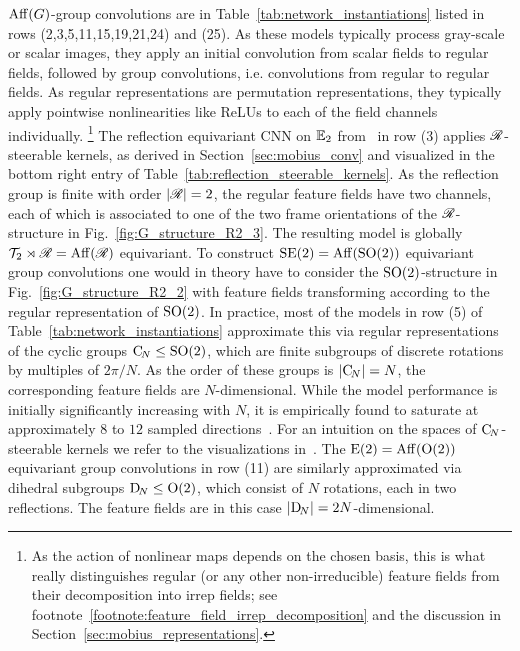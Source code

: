$\operatorname{Aff}(G)$-group convolutions are in Table~\ref{tab:network_instantiations} listed in rows (2,3,5,11,15,19,21,24) and (25).
As these models typically process gray-scale or scalar images, they apply an initial convolution from scalar fields to regular fields, followed by group convolutions, i.e. convolutions from regular to regular fields.
As regular representations are permutation representations, they typically apply pointwise nonlinearities like ReLUs to each of the field channels individually.%
\footnote{
    As the action of nonlinear maps depends on the chosen basis, this is what really distinguishes regular (or any other non-irreducible) feature fields from their decomposition into irrep fields; see footnote~\ref{footnote:feature_field_irrep_decomposition} and the discussion in Section~\ref{sec:mobius_representations}.
}
The reflection equivariant CNN on $\mathbb{E}_2$ from~\cite{Weiler2019_E2CNN} in 
row (3)
applies $\mathscr{R}$-steerable kernels, as derived in Section~\ref{sec:mobius_conv} and visualized in the bottom right entry of Table~\ref{tab:reflection_steerable_kernels}.
As the reflection group is finite with order $|\mathscr{R}| = 2$, the regular feature fields have two channels, each of which is associated to one of the two frame orientations of the $\mathscr{R}$-structure in Fig.~\ref{fig:G_structure_R2_3}.
The resulting model is globally $\mathcal{T}_2 \rtimes \mathscr{R} = \operatorname{Aff}(\mathscr{R})$ equivariant.
% 
To construct $\operatorname{SE}(2) = \operatorname{Aff}(\operatorname{SO}(2))$ equivariant group convolutions one would in theory have to consider the $\operatorname{SO}(2)$-structure in Fig.~\ref{fig:G_structure_R2_2} with feature fields transforming according to the regular representation of $\operatorname{SO}(2)$.
In practice, most of the models in 
row (5)
of Table~\ref{tab:network_instantiations}
approximate this via regular representations of the cyclic groups $\operatorname{C}_{\!N} \leq \operatorname{SO}(2)$, which are finite subgroups of discrete rotations by multiples of $2\pi/N$.
As the order of these groups is $|\!\operatorname{C}_{\!N}\!|=N$, the corresponding feature fields are $N$-dimensional.
While the model performance is initially significantly increasing with $N$, it is empirically found to saturate at approximately $8$ to $12$ sampled directions~\cite{Weiler2018SFCNN,Weiler2019_E2CNN,bekkers2020bspline}.
For an intuition on the spaces of $\operatorname{C}_{\!N}$-steerable kernels we refer to the visualizations in~\cite{Weiler2018SFCNN,bekkers2018roto,bekkers2020bspline}.
%
The $\operatorname{E}(2) = \operatorname{Aff}(\operatorname{O}(2))$ equivariant group convolutions in
row (11)
are similarly approximated via dihedral subgroups $\operatorname{D}_{\!N} \leq \operatorname{O}(2)$, which consist of $N$ rotations, each in two reflections.
The feature fields are in this case $|\!\operatorname{D}_{\!N}\!| = 2N$-dimensional.
